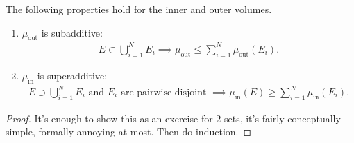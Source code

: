 \begin{lemma}\label{lem:prop-jordan-measure}
    The following properties hold for the inner and outer volumes.
    \begin{enumerate} 
        \item $\mu_{\text{out}}$ is subadditive:
        \begin{align*}
            E \subset \bigcup_{i=1}^{N} E_{i} \implies \mu_{\text{out}} \leq \sum_{i=1}^{N} \mu_{\text{out}}(E_{i}).
        \end{align*}
        \item $\mu_{\text{in}}$ is superadditive:
        \begin{align*}
            E \supset \bigcup_{i=1}^{N} E_{i} \text{ and } E_{i} \text{ are pairwise disjoint } \implies \mu_{\text{in}}(E) \geq \sum_{i=1}^{N}  \mu_{\text{in}}(E_{i}).
        \end{align*}
    \end{enumerate}
\end{lemma}
\begin{proof}
    It's enough to show this as an exercise for $2$ sets, it's fairly conceptually simple, formally annoying at most. Then do induction.
\end{proof}

